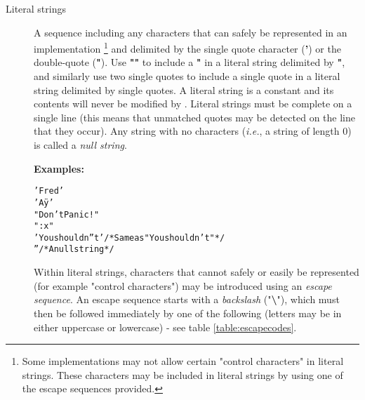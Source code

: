 \begin{description}
\item[Literal strings]\label{refxstr}
\index{,}
\index{,}

A sequence including any characters that can safely be represented in
an implementation
\footnote{
Some implementations may not allow certain "control characters"
in literal strings.
These characters may be included in literal strings by using one of the
escape sequences provided.
}
and delimited by the single quote character (\textbf{'}) or the
double-quote (\textbf{"}).
Use \textbf{""} to include a \textbf{"} in a literal
string delimited by \textbf{"}, and similarly use two single
quotes to include a single quote in a literal string delimited by
single quotes.
A literal string is a constant and its contents will never be modified
by \nr{}.
Literal strings must be complete on a single line (this means that
unmatched quotes may be detected on the line that they occur).
 Any string with no characters (\emph{i.e.}, a string of length 0) is called
a \emph{null string}.
 
\textbf{Examples:}
\begin{alltt}
'Fred'
'Aÿ'
"Don't Panic!"
":x"
'You shouldn''t'    /* Same as "You shouldn't" */
''                  /* A null string */
\end{alltt}
 
Within literal strings, characters that cannot safely or easily be
represented (for example "control characters") may be introduced
using an \emph{escape sequence}.  An escape sequence starts with a
\emph{backslash} ("\textbf{\textbackslash }"), which must then be
followed immediately by one of the following (letters may be in either
uppercase or lowercase) - see table \ref{table:escapecodes}.


\end{description}
